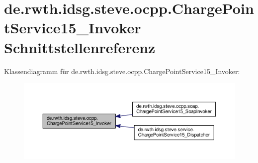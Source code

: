 \hypertarget{interfacede_1_1rwth_1_1idsg_1_1steve_1_1ocpp_1_1_charge_point_service15___invoker}{\section{de.\-rwth.\-idsg.\-steve.\-ocpp.\-Charge\-Point\-Service15\-\_\-\-Invoker Schnittstellenreferenz}
\label{interfacede_1_1rwth_1_1idsg_1_1steve_1_1ocpp_1_1_charge_point_service15___invoker}
}


Klassendiagramm für de.\-rwth.\-idsg.\-steve.\-ocpp.\-Charge\-Point\-Service15\-\_\-\-Invoker\-:
\nopagebreak
\begin{figure}[H]
\begin{center}
\leavevmode
\includegraphics[width=350pt]{interfacede_1_1rwth_1_1idsg_1_1steve_1_1ocpp_1_1_charge_point_service15___invoker__inherit__graph}
\end{center}
\end{figure}
